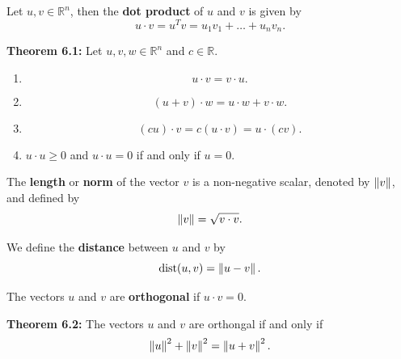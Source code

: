 \newpage

\begin{defn} Let $u, v \in \mathbb{R}^n$, then the {\bf dot product} of $u$ and $v$ is given by $$u \cdot v= u^{T}v=u_1 v_1+\dots+ u_n v_n.$$
\end{defn}

{\bf Theorem 6.1:} Let $u, v, w \in \mathbb{R}^n$ and $c\in \mathbb{R}$.
\begin{enumerate}
\item $$ u \cdot v = v \cdot u.$$
\item $$(u+v)\cdot w= u \cdot w+ v \cdot w.$$
\item $$(cu)\cdot v = c(u\cdot v)= u \cdot (cv).$$
\item $u \cdot u \geq 0$ and $u \cdot u =0$ if and only if $u=0$.
\end{enumerate}

\begin{defn} The {\bf length} or {\bf norm} of the vector $v$ is a non-negative scalar, denoted by $\left\lVert v\right\rVert$, and defined by $$\left\lVert v\right\rVert= \sqrt{v\cdot v}.$$
\end{defn}

\begin{defn} We define the {\bf distance} between $u$ and $v$ by $$\text{dist}(u,v)=\left\lVert u-v\right\rVert.$$
\end{defn}

\begin{defn} The vectors $u$ and $v$ are {\bf orthogonal} if $u\cdot v=0$.
\end{defn}

{\bf Theorem 6.2:} The vectors $u$ and $v$ are orthongal if and only if $$\left\lVert u\right\rVert^2+\left\lVert v\right\rVert^2=\left\lVert u+v\right\rVert^2.$$

